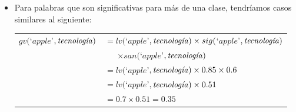 \begin{itemize}
{        \begin{tabular}{l@{}l}%
            $gv($`$pan$'$, \text{\emph{alimentos}})$ & $= lv($`$pan$'$, \text{\emph{alimentos}})\times sig($`$pan$'$, \text{\emph{alimentos}})$\\ 
            					& \ \ \ $\times san($`$pan$'$, \text{\emph{alimentos}})$\\
                                & $= lv($`$pan$'$, \text{\emph{alimentos}})\times 0.99\times 0.95$\\
                                & $= lv($`$pan$'$, \text{\emph{alimentos}})\times 0.94$\\
                                & $= 0.65\times 0.94 = 0.61$
        \end{tabular}
        
        \vspace{5mm}

        El \emph{valor global} terminó siendo casi idéntico a su \emph{valor local} ---siendo más exactos, un $94\%$ de éste. Esto se debe a que no sólo la palabra fue significativa para \emph{alimentos} ($ sig($`$pan$'$, \text{\emph{alimentos}})=0.99$), sino que, además, prácticamente no se le aplicó ninguna sanción ($san($`$pan$'$, \text{\emph{alimentos}})=0.95$) debido a que no fue significativa para casi ninguna otra clase.
    }
    \vspace{5mm}
    \item {
        Para palabras que son significativas para más de una clase, tendríamos casos similares al siguiente:

        \vspace{5mm}

        \begin{tabular}{l@{}l}%
            $gv($`$apple$'$, \text{\emph{tecnología}})$ & $= lv($`$apple$'$, \text{\emph{tecnología}})\times sig($`$apple$'$, \text{\emph{tecnología}})$\\
            					& \ \ \ $\times san($`$apple$'$, \text{\emph{tecnología}})$\\
                                & $= lv($`$apple$'$, \text{\emph{tecnología}})\times 0.85\times 0.6$\\
                                & $= lv($`$apple$'$, \text{\emph{tecnología}})\times 0.51$\\
                                & $= 0.7\times 0.51 = 0.35$
        \end{tabular}
        
}
\end{itemize}
